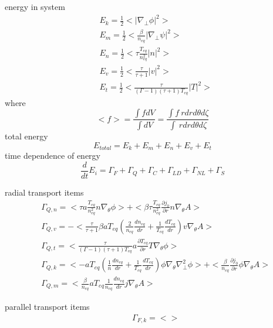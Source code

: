\documentclass[11pt,a4paper]{article}
\begin{document}
energy in system
\begin{equation}
\begin{aligned}
	&E_k=\frac{1}{2}<|\nabla_\perp\phi|^2>	\\
	&E_m=\frac{1}{2}<\frac{\beta}{n_{eq}}|\nabla_\perp\psi|^2>	\\
	&E_n=\frac{1}{2}<\tau\frac{T_{eq}}{n_{eq}^2}|n|^2>	\\
	&E_v=\frac{1}{2}<{\frac{\tau}{\tau+1}}|v|^2>	\\
	&E_t=\frac{1}{2}<{\frac{\tau}{(\Gamma-1)(\tau+1)T_{eq}}}|T|^2>
\end{aligned}
\end{equation}
where 
\begin{equation}
<f>=\frac{\int{f}dV}{\int{dV}}
=\frac{\int{f}\ rdrd\theta{d\zeta}}{\int\ rdrd\theta{d\zeta}}
\end{equation}
total energy
\begin{equation}
	E_{total}={E_k+E_m+E_n+E_v+E_t} 
\end{equation}
time dependence of energy
\begin{equation}
\frac{d}{dt}E_i=\Gamma_F+\Gamma_Q+\Gamma_C+\Gamma_{LD}+\Gamma_{NL}+\Gamma_{S}
\end{equation}


radial transport items
\begin{equation}
\begin{aligned}
	&\Gamma_{Q,n}=<\tau{a}\frac{T_{eq}}{n_{eq}^2}n\nabla_\theta\phi>+<\beta\tau\frac{T_{eq}}{n_{eq}^2}\frac{\partial{j_0}}{\partial{r}}n\nabla_\theta{A}>	\\
	&\Gamma_{Q,v}=-<\frac{\tau}{\tau+1}\beta{aT_{eq}}(\frac{2}{n_{eq}}\frac{dn_{eq}}{dr}+\frac{1}{T_{eq}}\frac{dT_{eq}}{dr})v\nabla_\theta{A}>	\\
	&\Gamma_{Q,t}=<{\frac{\tau}{(\Gamma-1)(\tau+1)T_{eq}}}a\frac{\partial{T_{eq}}}{\partial{r}}T\nabla_\theta\phi>	\\
	&\Gamma_{Q,k}=<-aT_{eq}(\frac{1}{n}\frac{dn_{eq}}{dr}+\frac{1}{T_{eq}}\frac{dT_{eq}}{dr})\phi\nabla_\theta\nabla^2_\perp\phi>+<\frac{\beta}{n_{eq}}\frac{\partial{j_0}}{\partial{r}}\phi\nabla_\theta{A}>	\\
	&\Gamma_{Q,m}=<\frac{\beta}{n_{eq}}{aT_{eq}}\frac{1}{n_{eq}}\frac{dn_{eq}}{dr}j\nabla_\theta{A}>
\end{aligned}
\end{equation}

parallel transport items
\begin{equation}
\begin{aligned}
&\Gamma_{F,k}=<>
\end{aligned}
\end{equation}
\end{document}

